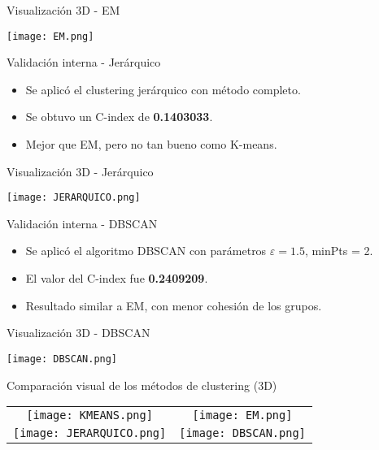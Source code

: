 \documentclass[
	11pt, %
]{beamer}
\begin{document}
\begin{frame}{Visualización 3D - EM}
\begin{center}
    \texttt{[image: EM.png]}
\end{center}
\end{frame}

\begin{frame}{Validación interna - Jerárquico}
\begin{itemize}
    \item Se aplicó el clustering jerárquico con método completo.
    \item Se obtuvo un C-index de \textbf{0.1403033}.
    \item Mejor que EM, pero no tan bueno como K-means.
\end{itemize}
\end{frame}

\begin{frame}{Visualización 3D - Jerárquico}
\begin{center}
    \texttt{[image: JERARQUICO.png]}
\end{center}
\end{frame}

\begin{frame}{Validación interna - DBSCAN}
\begin{itemize}
    \item Se aplicó el algoritmo DBSCAN con parámetros $\varepsilon = 1.5$, minPts = 2.
    \item El valor del C-index fue \textbf{0.2409209}.
    \item Resultado similar a EM, con menor cohesión de los grupos.
\end{itemize}
\end{frame}

\begin{frame}{Visualización 3D - DBSCAN}
\begin{center}
    \texttt{[image: DBSCAN.png]}
\end{center}
\end{frame}

\begin{frame}{Comparación visual de los métodos de clustering (3D)}

\begin{center}
\begin{tabular}{cc}
    \texttt{[image: KMEANS.png]} & 
    \texttt{[image: EM.png]} \\

    \texttt{[image: JERARQUICO.png]} & 
    \texttt{[image: DBSCAN.png]} \\

\end{tabular}
\end{center}

\end{frame}
\end{document}
